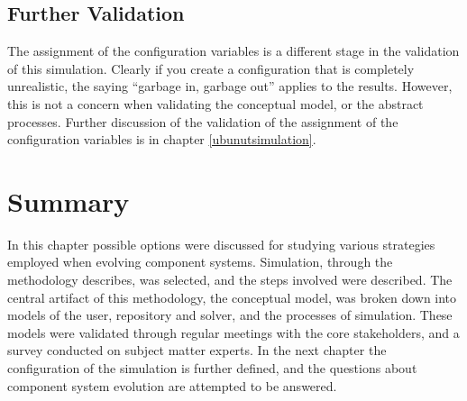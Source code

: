 \subsection{Further Validation}
The assignment of the configuration variables is a different stage in the validation of this simulation.
Clearly if you create a configuration that is completely unrealistic, the saying ``garbage in, garbage out'' applies to the results.
However, this is not a concern when validating the conceptual model, or the abstract processes.
Further discussion of the validation of the assignment of the configuration variables is in chapter \ref{ubunutsimulation}.

\section{Summary}
{}In this chapter possible options were discussed for studying various strategies employed when evolving component systems.
{}Simulation, through the methodology \cite{Law2005} describes, was selected, and the steps involved were described.
{}The central artifact of this methodology, the conceptual model, was broken down into models of the user, repository and solver, and the processes of simulation.
{}These models were validated through regular meetings with the core stakeholders, and a survey conducted on subject matter experts.
{}In the next chapter the configuration of the simulation is further defined, and the questions about component system evolution are attempted to be answered.
